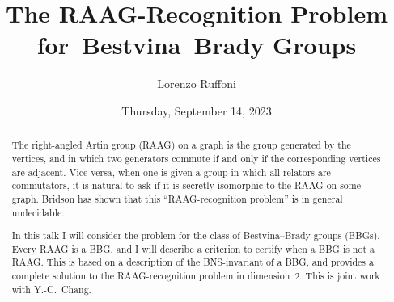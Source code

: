 \documentclass{UAmathtalk}
\author{Lorenzo Ruffoni}
\title{The RAAG-Recognition Problem for~Bestvina--Brady Groups}
\date{Thursday, September 14, 2023}
\begin{document}
\maketitle

\begin{abstract}
The right-angled Artin group (RAAG) on a graph is the group generated by the vertices, and in which two generators commute if and only if the corresponding vertices are adjacent. Vice versa, when one is given a group in which all relators are commutators, it is natural to ask if it is secretly isomorphic to the RAAG on some graph. Bridson has shown that this “RAAG-recognition problem” is in general undecidable.

In this talk I will consider the problem for the class of Bestvina--Brady groups (BBGs). Every RAAG is a BBG, and I will describe a criterion to certify when a BBG is not a RAAG. This is based on a description of the BNS-invariant of a BBG, and provides a complete solution to the RAAG-recognition problem in dimension~$2$. This is joint work with Y.-C.~Chang.
\end{abstract}
\end{document}
